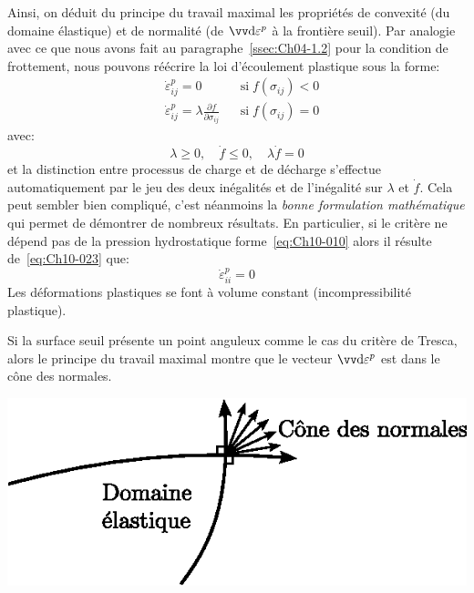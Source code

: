 Ainsi, on déduit du principe du travail maximal les propriétés de convexité (du domaine élastique) et de normalité (de $\vec{\ud \varepsilon^p}$ à la frontière seuil). 
Par analogie avec ce que nous avons fait au paragraphe~\ref{ssec:Ch04-1.2} pour la condition de frottement, nous pouvons réécrire la loi d'écoulement plastique sous la forme: 
\begin{equation}
    \begin{aligned}
       & \dot{\varepsilon}_{ij}^p = 0 && \text{si}\; f\left( \sigma_{ij} \right) < 0 \\
       & \dot{\varepsilon}_{ij}^p = \lambda \frac{\partial f}{\partial \sigma_{ij}} && \text{si}\; f\left( \sigma_{ij} \right) = 0
    \end{aligned}
    \label{eq:Ch10-023}
\end{equation}
avec:
\[
\lambda \geq 0,\quad \dot{f} \leq 0,\quad \lambda \dot{f} = 0
\]
et la distinction entre processus de charge et de décharge s'effectue automatiquement par le jeu des deux inégalités et de l'inégalité sur $\lambda$ et $\dot{f}$.
Cela peut sembler bien compliqué, c'est néanmoins la \emph{bonne formulation mathématique} qui permet de démontrer de nombreux résultats. 
En particulier, si le critère ne dépend pas de la pression hydrostatique forme~\eqref{eq:Ch10-010} alors il résulte de~\eqref{eq:Ch10-023} que: 
\begin{equation}
    \dot{\varepsilon}_{ii}^p = 0
    \label{eq:Ch10-024}
\end{equation}
Les déformations plastiques se font à volume constant (incompressibilité plastique). 

Si la surface seuil présente un point anguleux comme le cas du critère de Tresca, alors le principe du travail maximal montre que le vecteur $\vec{\ud \varepsilon^p}$ est dans le cône des normales.  
\begin{center}
    \includegraphics{../images/T1_Ch10-11}
\end{center}

